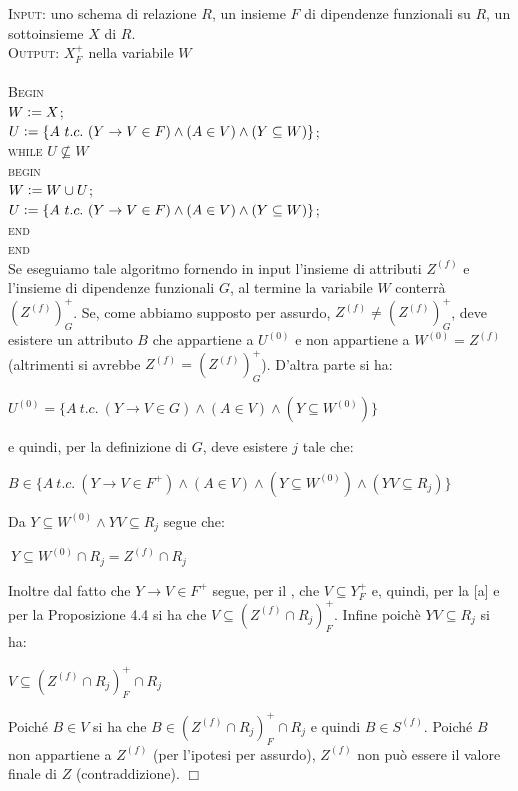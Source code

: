 \noindent\textsc{Input:} uno schema di relazione $R$, un insieme $F$ di dipendenze funzionali su $R$, un sottoinsieme
$X$ di $R$.\\
\textsc{Output:} $X^+_F$ nella variabile $W$\\\\
\textsc{Begin}\\
$W\vcentcolon= X$;\\
$U\vcentcolon= \{A\ t.c.\ (Y \rightarrow V \in F) \wedge (A \in V) \wedge (Y \subseteq W)\}$;\\
\textsc{while} $U \not \subseteq W$\\
\indent \textsc{begin}\\
\indent $W\vcentcolon = W \cup U$;\\
\indent $U\vcentcolon= \{A\ t.c.\ (Y \rightarrow V \in F) \wedge (A \in V) \wedge (Y \subseteq W)\}$;\\
\indent \textsc{end}\\
\textsc{end}\\

Se eseguiamo tale algoritmo fornendo in input l'insieme di attributi $Z^{(f)}$ e l'insieme di dipendenze 
funzionali $G$, al termine la variabile $W$ conterrà $(Z^{(f)})^+_G$. Se, come abbiamo supposto per assurdo,
$Z^{(f)}\not =(Z^{(f)})^+_G$, deve esistere un attributo $B$ che appartiene a $U^{(0)}$ e non appartiene 
a $W^{(0)} =Z^{(f)}$ (altrimenti si avrebbe $Z^{(f)} =(Z^{(f)})^+_G$). D'altra parte si ha:
\begin{center}
\begin{math}
U^{(0)} = \{A\ t.c.\ (Y \rightarrow V \in G) \wedge (A \in V) \wedge (Y \subseteq W^{(0)})\}
\end{math}
\end{center}
e quindi, per la definizione di $G$, deve esistere $j$ tale che:
\begin{center}
 \begin{math}
  B \in \{A\ t.c.\ (Y \rightarrow V \in F^+) \wedge (A \in V) \wedge (Y \subseteq W^{(0)}) \wedge (YV \subseteq R_j)\}
 \end{math}
\end{center}
Da $Y \subseteq W^{(0)} \wedge YV \subseteq R_j$ segue che:
\begin{center}
 \begin{math}
  [a]\ Y \subseteq W^{(0)} \cap R_j = Z^{(f)} \cap R_j
 \end{math}
\end{center}
Inoltre dal fatto che $Y \rightarrow V \in F^+$ segue, per il , che $V \subseteq Y^+_F$
e, quindi, per la [a] e per la Proposizione 4.4 si ha che $V \subseteq (Z^{(f)} \cap R_j)^+_F$. Infine 
poichè $YV \subseteq R_j$ si ha:
\begin{center}
 \begin{math}
 V \subseteq (Z^{(f)} \cap R_j)^+_F \cap R_j
 \end{math}
\end{center}
Poiché $B \in V$ si ha che $B \in (Z^{(f)} \cap R_j)^+_F \cap R_j$ e quindi $B \in S^{(f)}$. Poiché $B$ non 
appartiene a $Z^{(f)}$ (per l'ipotesi per assurdo), $Z^{(f)}$ non può essere il valore finale di $Z$ 
(contraddizione). \hfill $\Box$

